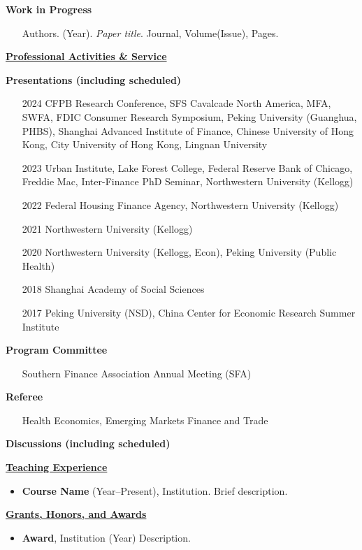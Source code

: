 \documentclass[11pt]{article}
\newcommand{\cvsection}[1]{%
    \vspace{1em}%
    \noindent\textbf{\uline{#1}}%
    \vspace{1em}%
}
\begin{document}
\noindent\textbf{Work in Progress}
\begin{itemize}[leftmargin=1em, labelwidth=0em, labelsep=0em, itemindent=0em, align=left]
    \item[] Authors. (Year). \textit{Paper title}. Journal, Volume(Issue), Pages.
\end{itemize}

\cvsection{Professional Activities \& Service}

\noindent\textbf{Presentations (including scheduled)}
\begin{itemize}[leftmargin=4em, labelwidth=2em, labelsep=1em, itemindent=0em, align=left]
    \item[2024] CFPB Research Conference, SFS Cavalcade North America, MFA, SWFA, FDIC Consumer Research Symposium, Peking University (Guanghua, PHBS), Shanghai Advanced Institute of Finance, Chinese University of Hong Kong, City University of Hong Kong, Lingnan University
    \item[2023] Urban Institute, Lake Forest College, Federal Reserve Bank of Chicago, Freddie Mac, Inter-Finance PhD Seminar, Northwestern University (Kellogg)
    \item[2022] Federal Housing Finance Agency, Northwestern University (Kellogg)
    \item[2021] Northwestern University (Kellogg)
    \item[2020] Northwestern University (Kellogg, Econ), Peking University (Public Health)
    \item[2018] Shanghai Academy of Social Sciences
    \item[2017] Peking University (NSD), China Center for Economic Research Summer Institute
\end{itemize}

\noindent\textbf{Program Committee}
\begin{itemize}[leftmargin=4em, labelwidth=2em, labelsep=1em, itemindent=0em, align=left]
    \item[] Southern Finance Association Annual Meeting (SFA)
\end{itemize}

\noindent\textbf{Referee}
\begin{itemize}[leftmargin=4em, labelwidth=2em, labelsep=1em, itemindent=0em, align=left]
    \item[] Health Economics, Emerging Markets Finance and Trade
\end{itemize}

\noindent\textbf{Discussions (including scheduled)}

\cvsection{Teaching Experience}
\begin{itemize}[leftmargin=*]
    \item \textbf{Course Name} (Year–Present), Institution. Brief description.
\end{itemize}

\cvsection{Grants, Honors, and Awards}
\begin{itemize}[leftmargin=*]
    \item \textbf{Award}, Institution (Year) Description.
\end{itemize}
\end{document}
